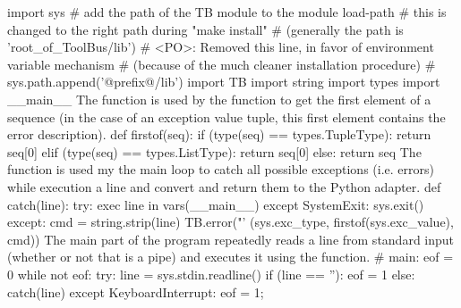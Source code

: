 import sys
# add the path of the TB module to the module load-path
# this is changed to the right path during "make install" 
# (generally the path is 'root_of_ToolBus/lib')
# <PO>: Removed this line, in favor of environment variable mechanism
#       (because of the much cleaner installation procedure)
# sys.path.append('@prefix@/lib')
import TB
import string
import types
import __main__
\nwendcode{}\nwdocspar
The  function is used by the  function
to get the first element of a sequence (in the case of an exception
value tuple, this first element contains the error description).
\nwenddocs{}\plusendmoddef\let\nwnotused=\nwoutput{}\nwstartdeflinemarkup{}\nwenddeflinemarkup
def firstof(seq):
        if (type(seq) == types.TupleType):
                return seq[0]
        elif (type(seq) == types.ListType):
                return seq[0]
        else:
                return seq
\nwendcode{}\nwdocspar
The  function is used my the main loop to catch all
possible exceptions (i.e. errors) while execution a line and
convert and return them to the Python adapter.
\nwenddocs{}\plusendmoddef\let\nwnotused=\nwoutput{}\nwstartdeflinemarkup{}\nwenddeflinemarkup
def catch(line):
        try:
                exec line in vars(__main__)
        except SystemExit:
                sys.exit()
        except:
                cmd = string.strip(line)
                TB.error("'%
                         (sys.exc_type, firstof(sys.exc_value), cmd))
\nwendcode{}\nwdocspar
The main part of the program repeatedly reads a line from standard
input (whether or not that is a pipe) and executes it using the
 function.
\nwenddocs{}\plusendmoddef\let\nwnotused=\nwoutput{}\nwstartdeflinemarkup{}\nwenddeflinemarkup
# main:
eof = 0
while not eof:
        try:
                line = sys.stdin.readline()     
                if (line == ''):
                        eof = 1
                else:
                        catch(line)
        except KeyboardInterrupt:
                eof = 1;
\nwendcode{}

%
\nwdocspar

\nwenddocs{}
